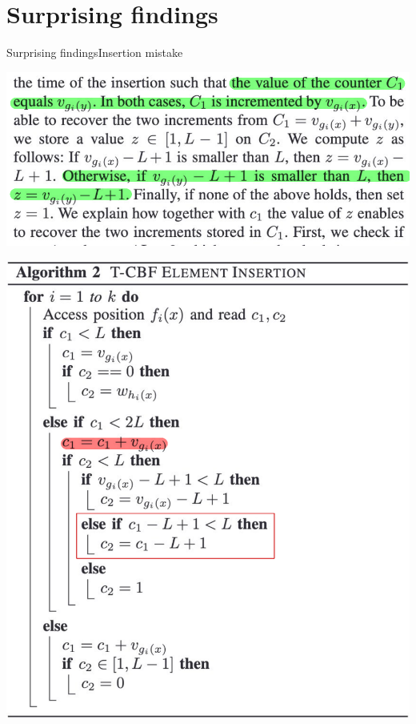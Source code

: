 \documentclass[
  english,            %
  aspectratio=169,    %
]{tumbeamer}
\begin{document}
\section{Surprising findings}
\begin{frame}{Surprising findings}{Insertion mistake}
  \begin{minipage}{0.5\textwidth}
    \includegraphics[width=\linewidth]{img/tbf_insertion_text_mark.pdf}
  \end{minipage}
  \begin{minipage}{0.35\textwidth}
    \includegraphics[width=\linewidth]{img/tbf_insertion_pseudo_mark.pdf}
  \end{minipage}
\end{frame}
\end{document}
